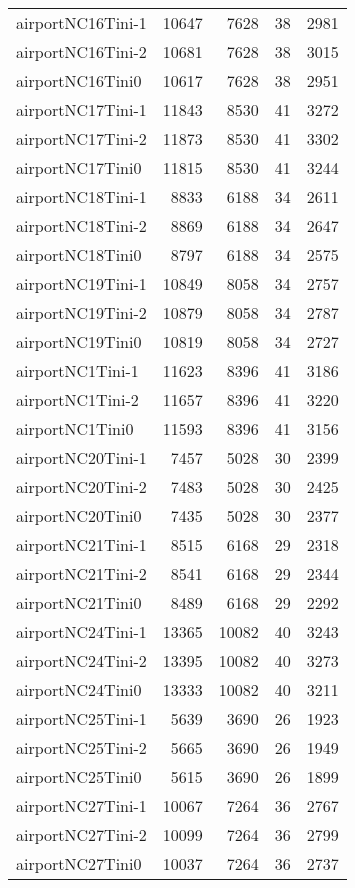 \begin{longtable}{lrrrr}
airportNC16Tini-1 & 10647 & 7628 & 38 & 2981 \\
airportNC16Tini-2 & 10681 & 7628 & 38 & 3015 \\
airportNC16Tini0 & 10617 & 7628 & 38 & 2951 \\
airportNC17Tini-1 & 11843 & 8530 & 41 & 3272 \\
airportNC17Tini-2 & 11873 & 8530 & 41 & 3302 \\
airportNC17Tini0 & 11815 & 8530 & 41 & 3244 \\
airportNC18Tini-1 & 8833 & 6188 & 34 & 2611 \\
airportNC18Tini-2 & 8869 & 6188 & 34 & 2647 \\
airportNC18Tini0 & 8797 & 6188 & 34 & 2575 \\
airportNC19Tini-1 & 10849 & 8058 & 34 & 2757 \\
airportNC19Tini-2 & 10879 & 8058 & 34 & 2787 \\
airportNC19Tini0 & 10819 & 8058 & 34 & 2727 \\
airportNC1Tini-1 & 11623 & 8396 & 41 & 3186 \\
airportNC1Tini-2 & 11657 & 8396 & 41 & 3220 \\
airportNC1Tini0 & 11593 & 8396 & 41 & 3156 \\
airportNC20Tini-1 & 7457 & 5028 & 30 & 2399 \\
airportNC20Tini-2 & 7483 & 5028 & 30 & 2425 \\
airportNC20Tini0 & 7435 & 5028 & 30 & 2377 \\
airportNC21Tini-1 & 8515 & 6168 & 29 & 2318 \\
airportNC21Tini-2 & 8541 & 6168 & 29 & 2344 \\
airportNC21Tini0 & 8489 & 6168 & 29 & 2292 \\
airportNC24Tini-1 & 13365 & 10082 & 40 & 3243 \\
airportNC24Tini-2 & 13395 & 10082 & 40 & 3273 \\
airportNC24Tini0 & 13333 & 10082 & 40 & 3211 \\
airportNC25Tini-1 & 5639 & 3690 & 26 & 1923 \\
airportNC25Tini-2 & 5665 & 3690 & 26 & 1949 \\
airportNC25Tini0 & 5615 & 3690 & 26 & 1899 \\
airportNC27Tini-1 & 10067 & 7264 & 36 & 2767 \\
airportNC27Tini-2 & 10099 & 7264 & 36 & 2799 \\
airportNC27Tini0 & 10037 & 7264 & 36 & 2737 \\

\end{longtable}
